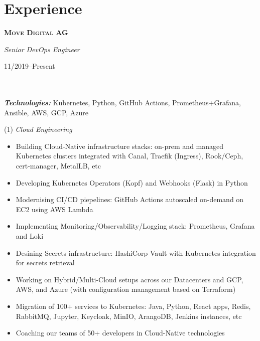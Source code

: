 \documentclass[$fontsize$, a4paper]{article}
\newcommand\textbox[1]{%
  \parbox{.333\textwidth}{#1}%
}
\begin{document}
  
  
  
  
  



\section*{Experience}
\noindent

\noindent\textbox{\textbf{\textsc{Move Digital AG}}\hfill}\textbox{\hfil \emph{Senior DevOps Engineer}\hfil}\textbox{\hfill 11/2019--Present}\\\\
\textbf{\textit{Technologies:}} Kubernetes, Python, GitHub Actions, Prometheus+Grafana, Ansible, AWS, GCP, Azure

\vspace{5pt}
(1) \emph{Cloud Engineering}
\begin{itemize}
  \setlength\itemsep{0em}
  \item Building Cloud-Native infrastructure stacks: on-prem and managed Kubernetes clusters integrated with Canal, Traefik (Ingress), Rook/Ceph, cert-manager, MetalLB, etc
  \item Developing Kubernetes Operators (Kopf) and Webhooks (Flask) in Python
  \item Modernising CI/CD piepelines: GitHub Actions autoscaled on-demand on EC2 using AWS Lambda
  \item Implementing Monitoring/Observability/Logging stack: Prometheus, Grafana and Loki
  \item Desining Secrets infrastructure: HashiCorp Vault with Kubernetes integration for secrets retrieval
  \item Working on Hybrid/Multi-Cloud setups across our Datacenters and GCP, AWS, and Azure (with configuration management based on Terraform)
  \item Migration of 100+ services to Kubernetes: Java, Python, React apps, Redis, RabbitMQ, Jupyter, Keycloak, MinIO, ArangoDB, Jenkins instances, etc
  \item Coaching our teams of 50+ developers in Cloud-Native technologies
\end{itemize}
\end{document}
